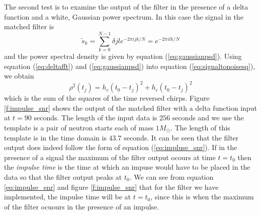 The second test is to examine the output of the filter in the presence of a
delta function and a white, Gaussian power spectrum. In this case the signal
in the matched filter is
\begin{equation}
\tilde{s}_k = \sum_{k=0}^{N-1} \delta{jl} e^{-2\pi ijk/N} = e^{-2\pi ilk/N}
\label{eq:deltafft}
\end{equation}
and the power spectral density is given by equation (\ref{eq:gaussianpsd}).
Using equation (\ref{eq:deltafft}) and (\ref{eq:gaussianpsd}) into equation
(\ref{eq:signaltonoisesq}), we obtain
\begin{equation}
\rho^2(t_j) = h_c(t_0 - t_j)^2 + h_c(t_0 - t_j)^2
\label{eq:impulse_snr}
\end{equation}
which is the sum of the squares of the time reversed chirps.  Figure
\ref{f:impulse_snr} shows the output of the matched filter with a delta
function input at $t=90$ seconds. The length of the input data is $256$
seconds and we use the template is a pair of neutron starts each of
mass $1 M_\odot$. The length of this template is in the time domain is $43.7$
seconds.  It can be seen that the filter output does indeed follow the form of
equation (\ref{eq:impluse_snr}). If in the presence of a signal
the maximum of the filter output ocours at time $t = t_0$ then the
\emph{impulse time} is the time at which an impuse would have to be placed in
the data so that the filter output peaks at $t_0$. We can see from equation
\ref{eq:impulse_snr} and figure \ref{f:impulse_snr} that for the filter we
have implemented, the impulse time will be at $t = t_0$, since this is when
the maximum of the filter ocuours in the presence of an impulse.
